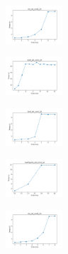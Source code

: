 \begin{figure}[H]    
    \centering
    \begin{subfigure}
        \centering
        \includegraphics[width=0.234\textwidth]{img/es/iris_set_const_20_949004259_time.png}
    \end{subfigure}
    \hfill
    \begin{subfigure}
        \centering
        \includegraphics[width=0.234\textwidth]{img/es/ecoli_set_const_20_949004259_time.png}
    \end{subfigure}
    \hfill
    \begin{subfigure}
        \centering
        \includegraphics[width=0.234\textwidth]{img/es/rand_set_const_20_949004259_time.png}
    \end{subfigure}
    \hfill
    \begin{subfigure}
        \centering
        \includegraphics[width=0.234\textwidth]{img/es/newthyroid_set_const_20_949004259_time.png}
    \end{subfigure}
    \hfill
    \begin{subfigure}
        \centering
        \includegraphics[width=0.234\textwidth]{img/es/iris_set_const_20_589741062_time.png}
    \end{subfigure}
    \hfill
    \begin{subfigure}

\end{subfigure}
\end{figure}
